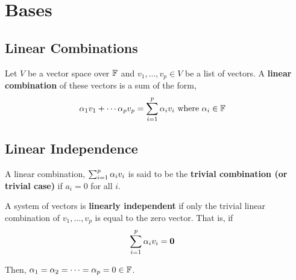 \section{Bases}

\subsection{Linear Combinations}
\begin{definition}
    Let $V$ be a vector space over $\mathbb{F}$ and $v_1, ..., v_p \in V$ be a list of vectors. A \textbf{linear combination} of these vectors is a sum of the
    form,
    \begin{align*}
        \alpha_1 v_1 + \cdots \alpha_p v_p &= \sum_{i = 1}^{p} \alpha_i v_i \text{ where $\alpha_i \in \mathbb{F}$}
    \end{align*}
\end{definition}

\subsection{Linear Independence}
\begin{definition}
    A linear combination, $\sum_{i = 1}^{p} \alpha_i v_i$ is said to be the \textbf{trivial combination (or trivial case)} if $a_i = 0$ for all $i$.
\end{definition}

\begin{definition}
    A system of vectors is \textbf{linearly independent} if only the trivial linear combination of $v_1, ..., v_p$ is equal to the zero vector. That is, 
    if
    \begin{align*}
        \sum_{i = 1}^{p} \alpha_i v_i &= \mathbf{0}
    \end{align*}

    Then, $\alpha_1 = \alpha_2 = \cdots = \alpha_p = 0 \in \mathbb{F}$.
\end{definition}

